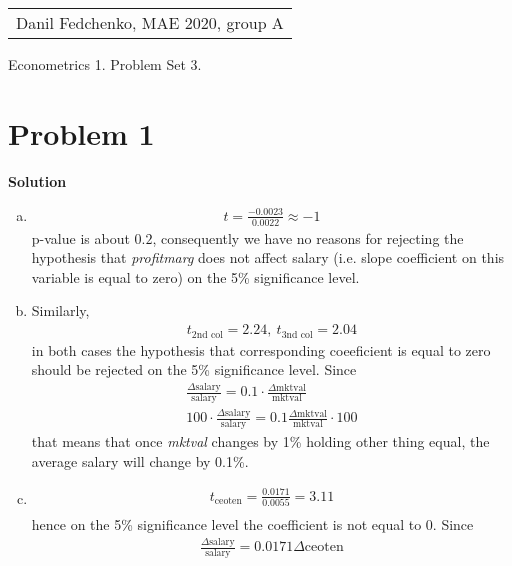\documentclass[a4paper]{article}
\begin{document}
	\begin{flushright}
	\begin{tabular}{r}
		Danil Fedchenko, MAE 2020, group A \\
	\end{tabular}
\end{flushright}


\begin{center}
	Econometrics 1. Problem Set 3.
\end{center}
\section*{Problem 1}

\textbf{Solution}


\begin{enumerate}[(a)]
	\item 
	\begin{align*}
	t = \frac{-0.0023}{0.0022} \approx -1
	\end{align*}
	p-value is about $0.2$, consequently we have no reasons for rejecting the hypothesis that \textit{profitmarg} does not affect salary (i.e. slope coefficient on this variable is equal to zero) on the 5\% significance level.
	\item Similarly,
	\begin{align*}
	t_{2\text{nd col}} = 2.24,\ t_{3\text{nd col}} = 2.04
	\end{align*}
	in both cases the hypothesis that corresponding coeeficient is equal to zero should be rejected on the 5\% significance level. Since
	\begin{align*}
	\frac{\Delta \text{salary}}{\text{salary}} = 0.1 \cdot \frac{\Delta \text{mktval}}{\text{mktval}}\\
	100 \cdot \frac{\Delta \text{salary}}{\text{salary}} = 0.1 \frac{\Delta \text{mktval}}{\text{mktval}} \cdot 100
	\end{align*}
	that means that once \textit{mktval} changes by 1\% holding other thing equal, the average salary will change by 0.1\%.
	\item 
	\begin{align*}
	t_{\text{ceoten}} = \frac{0.0171}{0.0055} = 3.11\\
	\end{align*}
	hence on the 5\% significance level the coefficient is not equal to 0.
	Since
	\begin{align*}
		\frac{\Delta \text{salary}}{\text{salary}} = 0.0171 \Delta \text{ceoten}\\

\end{align*}
\end{enumerate}
\end{document}
